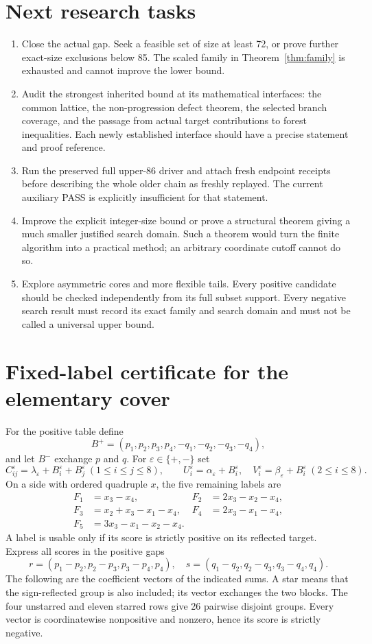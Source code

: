 \documentclass[11pt,a4paper]{article}
\theoremstyle{remark}\newtheorem{remark}[theorem]{Remark}
\begin{document}
\section{Next research tasks}
\begin{enumerate}
\item Close the actual gap. Seek a feasible set of size at least 72, or prove further exact-size exclusions below 85. The scaled family in Theorem~\ref{thm:family} is exhausted and cannot improve the lower bound.
\item Audit the strongest inherited bound at its mathematical interfaces: the common lattice, the non-progression defect theorem, the selected branch coverage, and the passage from actual target contributions to forest inequalities. Each newly established interface should have a precise statement and proof reference.
\item Run the preserved full upper-86 driver and attach fresh endpoint receipts before describing the whole older chain as freshly replayed. The current auxiliary PASS is explicitly insufficient for that statement.
\item Improve the explicit integer-size bound or prove a structural theorem giving a much smaller justified search domain. Such a theorem would turn the finite algorithm into a practical method; an arbitrary coordinate cutoff cannot do so.
\item Explore asymmetric cores and more flexible tails. Every positive candidate should be checked independently from its full subset support. Every negative search result must record its exact family and search domain and must not be called a universal upper bound.
\end{enumerate}

\appendix
\section{Fixed-label certificate for the elementary cover}\label{app:labels}
For the positive table define
\[B^+=(p_1,p_2,p_3,p_4,-q_1,-q_2,-q_3,-q_4),\]
and let $B^-$ exchange $p$ and $q$. For $\varepsilon\in\{+,-\}$ set
\[C^\varepsilon_{ij}=\lambda_\varepsilon+B^\varepsilon_i+B^\varepsilon_j
 \ (1\le i\le j\le8),\qquad
 U^\varepsilon_i=\alpha_\varepsilon+B^\varepsilon_i,\quad
 V^\varepsilon_i=\beta_\varepsilon+B^\varepsilon_i\ (2\le i\le8).\]
On a side with ordered quadruple $x$, the five remaining labels are
\[
\begin{aligned}
 F_1&=x_3-x_4,&F_2&=2x_3-x_2-x_4,\\
 F_3&=x_2+x_3-x_1-x_4,&F_4&=2x_3-x_1-x_4,\\
 F_5&=3x_3-x_1-x_2-x_4.&&
\end{aligned}
\]
A label is usable only if its score is strictly positive on its reflected target. Express all scores in the positive gaps
\[r=(p_1-p_2,p_2-p_3,p_3-p_4,p_4),\quad
 s=(q_1-q_2,q_2-q_3,q_3-q_4,q_4).\]
The following are the coefficient vectors of the indicated sums. A star means that the sign-reflected group is also included; its vector exchanges the two blocks. The four unstarred and eleven starred rows give 26 pairwise disjoint groups. Every vector is coordinatewise nonpositive and nonzero, hence its score is strictly negative.
\end{document}

